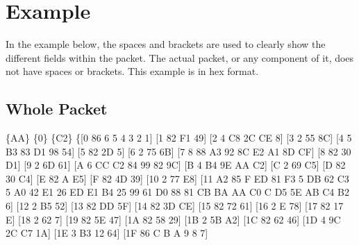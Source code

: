 \section{Example}

In the example below, the spaces and brackets are used to clearly show the different fields within the packet.  The actual packet, or any component of it, does not have spaces or brackets.  This example is in hex format.


\subsection{Whole Packet}

\{AA\} \hspace{0.25em} \{0\} \hspace{0.25em} \{C2\} \hspace{0.25em} \{[0 86 6 5 4 3 2 1] \hspace{0.25em} [1 82 F1 49] \hspace{0.25em} [2 4 C8 2C CE 8] \hspace{0.25em} [3 2 55 8C] \hspace{0.25em} [4 5 B3 83 D1 98 54] \hspace{0.25em} [5 82 2D 5] \hspace{0.25em} [6 2 75 6B] \hspace{0.25em} [7 8 88 A3 92 8C E2 A1 8D CF] \hspace{0.25em} [8 82 30 D1] \hspace{0.25em} [9 2 6D 61] \hspace{0.25em} [A 6 CC C2 84 99 82 9C] \hspace{0.25em} [B 4 B4 9E AA C2] \hspace{0.25em} [C 2 69 C5] \hspace{0.25em} [D 82 30 C4] \hspace{0.25em} [E 82 A E5] \hspace{0.25em} [F 82 4D 39] \hspace{0.25em} [10 2 77 E8] \hspace{0.25em} [11 A2 85 F ED 81 F3 5 DB 62 C3 5 A0 42 E1 26 ED E1 B4 25 99 61 D0 88 81 CB BA AA C0 C D5 5E AB C4 B2 6] \hspace{0.25em} [12 2 B5 52] \hspace{0.25em} [13 82 DD 5F] \hspace{0.25em} [14 82 3D CE] \hspace{0.25em} [15 82 72 61] \hspace{0.25em} [16 2 E 78] \hspace{0.25em} [17 82 17 E] \hspace{0.25em} [18 2 62 7] \hspace{0.25em} [19 82 5E 47] \hspace{0.25em} [1A 82 58 29] \hspace{0.25em} [1B 2 5B A2] \hspace{0.25em} [1C 82 62 46] \hspace{0.25em} [1D 4 9C 2C C7 1A] \hspace{0.25em} [1E 3 B3 12 64] \hspace{0.25em} [1F 86 C B A 9 8 7] 
